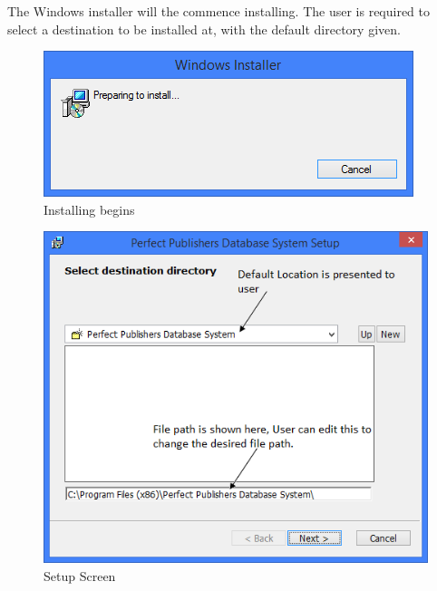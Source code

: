 The Windows installer will the commence installing. The user is required to select a destination to be installed at, with the default directory given.

\begin{figure}[H]
    \includegraphics[width=\textwidth]{./Manual/Installation/PrepareInstall.png}
    \caption{Installing begins}
\end{figure}

\begin{figure}[H]
    \includegraphics[width=\textwidth]{./Manual/Installation/Setup.png}
    \caption{Setup Screen}
\end{figure}

